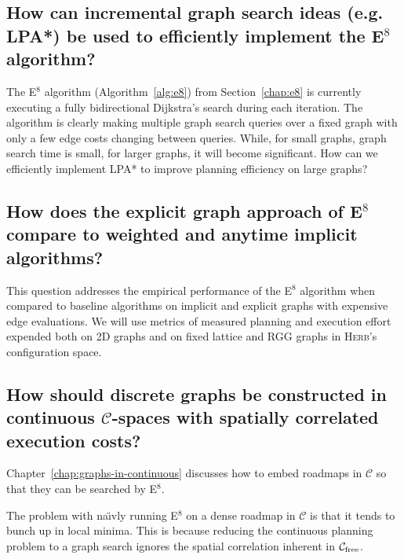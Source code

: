 {\subsection{How can incremental graph search ideas (e.g. LPA*)
   be used to efficiently implement the E$^8$ algorithm?}
\label{ques:incremental-search}

The E$^8$ algorithm (Algorithm~\ref{alg:e8}) from Section~\ref{chap:e8}
is currently executing a fully bidirectional Dijkstra's search
during each iteration.
The algorithm is clearly making multiple graph search queries
over a fixed graph with only a few edge costs changing between queries.
While, for small graphs, graph search time is small,
for larger graphs,
it will become significant.
How can we efficiently implement LPA* \cite{koenig2004lpastar}
to improve planning efficiency on large graphs?

\subsection{How does the explicit graph approach of E$^8$ compare to
   weighted and anytime implicit algorithms?}
\label{ques:e8-comparisons}

This question addresses the empirical performance of
the E$^8$ algorithm when compared to baseline algorithms
on implicit and explicit graphs with expensive edge evaluations.
We will use metrics of measured planning and execution effort
expended both on 2D graphs and on fixed lattice and RGG
graphs in \textsc{Herb}'s configuration space.

\subsection{How should discrete graphs be constructed in continuous
   $\mathcal{C}$-spaces with spatially correlated execution costs?}
\label{ques:batching}

Chapter~\ref{chap:graphs-in-continuous}
discusses how to embed roadmaps in $\mathcal{C}$
so that they can be searched by E$^8$.

The problem with na\"{\i}vly running E$^8$ on a
dense roadmap in $\mathcal{C}$
is that it tends to bunch up in local minima.
This is because reducing the continuous planning problem
to a graph search ignores the spatial correlation
inherent in $\mathcal{C}_{\mbox{\scriptsize free}}$.

}
